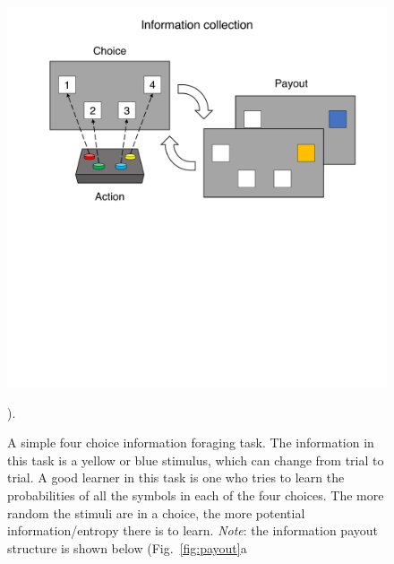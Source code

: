 \begin{figure}
	\begin{fullwidth}
	\includegraphics[width=.55\linewidth]{img/task_outline1.pdf} 
	\caption{A simple four choice information foraging task. The information in this task is a yellow or blue stimulus, which can change from trial to trial. A good learner in this task is one who tries to learn the probabilities of all the symbols in each of the four choices. The more random the stimuli are in a choice, the more potential information/entropy there is to learn. \textit{Note}: the information payout structure is shown below (Fig.~\ref{fig:payout}a}).
	\label{fig:task_outline1} 
	\end{fullwidth}
\end{figure}

